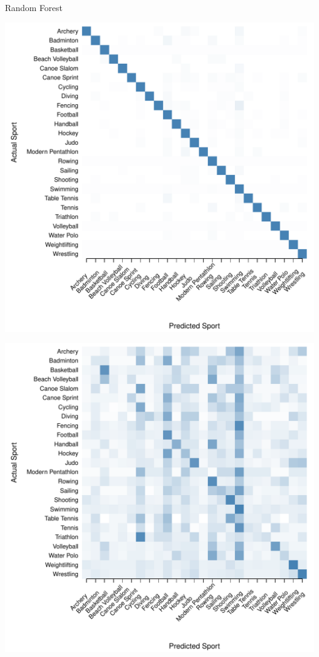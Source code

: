 \begin{center}
    Random Forest \\
  \begin{minipage}{0.45\textwidth}
    \begin{center}
      \includegraphics[scale=0.27]{../graphics/sportRF-trn.pdf}
    \end{center}
  \end{minipage}
  \hspace{0.05\textwidth}
  \begin{minipage}{0.45\textwidth}
    \begin{center}
      \includegraphics[scale=0.27]{../graphics/sportRF-tst.pdf}
    \end{center}
  \end{minipage}




\end{center}
